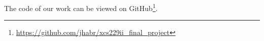 \par
The code of our work can be viewed on GitHub\footnote{\url{https://github.com/jhabr/xcs229ii_final_project}}.




